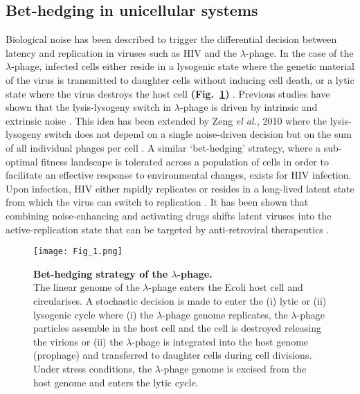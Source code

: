 \newpage

\subsection{Bet-hedging in unicellular systems}

Biological noise has been described to trigger the differential decision between latency and replication in viruses such as \gls{HIV} and the $\lambda$-phage. 
In the case of the $\lambda$-phage, infected cells either reside in a lysogenic state where the genetic material of the virus is transmitted to daughter cells without inducing cell death, or a lytic state where the virus destroys the host cell \textbf{(Fig.~\ref{fig0:bedhedging})} \citep{Lieb1953}. 
Previous studies have shown that the lysis-lysogeny switch in $\lambda$-phage is driven by intrinsic and extrinsic noise \citep{Arkin1998, St-Pierre2008}. 
This idea has been extended by Zeng \textit{el al.}, 2010 where the lysis-lysogeny switch does not depend on a single noise-driven decision but on the sum of all individual phages per cell \citep{Zeng2010}. 
A similar ‘bet-hedging’ strategy, where a sub-optimal fitness landscape is tolerated across a population of cells in order to facilitate an effective response to environmental changes, exists for \Gls{HIV} infection. 
Upon infection, \Gls{HIV} either rapidly replicates or resides in a long-lived latent state from which the virus can switch to replication \citep{Weinberger2015}. 
It has been shown that combining noise-enhancing and activating drugs shifts latent viruses into the active-replication state that can be targeted by anti-retroviral therapeutics \citep{Dar2014}. 

\begin{figure}[!h]
\centering
\texttt{[image: Fig\_1.png]}
\caption[Bet-hedging strategy of the $\lambda$-phage]{\textbf{Bet-hedging strategy of the $\lambda$-phage.}\\
The linear genome of the $\lambda$-phage enters the \Gls{Ecoli} host cell and circularises. 
A stochastic decision is made to enter the (i) lytic or (ii) lysogenic cycle where (i) the $\lambda$-phage genome replicates, the $\lambda$-phage particles assemble in the host cell and the cell is destroyed releasing the virions or (ii) the $\lambda$-phage is integrated into the host genome (prophage) and transferred to daughter cells during cell divisions. 
Under stress conditions, the $\lambda$-phage genome is excised from the host genome and enters the lytic cycle.}
\label{fig0:bedhedging}
\end{figure}

